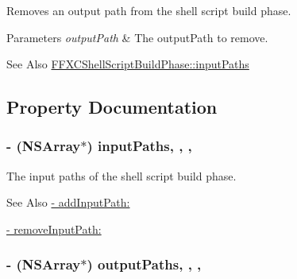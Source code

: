 Removes an output path from the shell script build phase. 
\begin{DoxyParams}{Parameters}
{\em output\-Path} & The output\-Path to remove. \\
\hline
\end{DoxyParams}
\begin{DoxySeeAlso}{See Also}
\hyperlink{interface_f_f_x_c_shell_script_build_phase_ad781d48348c3eac6e5e68aaded4d714f}{F\-F\-X\-C\-Shell\-Script\-Build\-Phase\-::input\-Paths} 
\end{DoxySeeAlso}


\subsection{Property Documentation}
\hypertarget{interface_f_f_x_c_shell_script_build_phase_ad781d48348c3eac6e5e68aaded4d714f}{
\subsubsection[{input\-Paths}]{\setlength{\rightskip}{0pt plus 5cm}-\/ (N\-S\-Array$\ast$) input\-Paths\hspace{0.3cm}{\ttfamily [read]}, {\ttfamily [write]}, {\ttfamily [nonatomic]}, {\ttfamily [strong]}}}\label{interface_f_f_x_c_shell_script_build_phase_ad781d48348c3eac6e5e68aaded4d714f}
The input paths of the shell script build phase. \begin{DoxySeeAlso}{See Also}
\hyperlink{interface_f_f_x_c_shell_script_build_phase_a0848de3624765e3930c55841ef062eab}{-\/ add\-Input\-Path\-:} 

\hyperlink{interface_f_f_x_c_shell_script_build_phase_ae426273f10e23456d8a38403bae781db}{-\/ remove\-Input\-Path\-:} 
\end{DoxySeeAlso}
\hypertarget{interface_f_f_x_c_shell_script_build_phase_a55d07f36a782c0d42d290bd91d271839}{
\subsubsection[{output\-Paths}]{\setlength{\rightskip}{0pt plus 5cm}-\/ (N\-S\-Array$\ast$) output\-Paths\hspace{0.3cm}{\ttfamily [read]}, {\ttfamily [write]}, {\ttfamily [nonatomic]}, {\ttfamily [strong]}}}\label{interface_f_f_x_c_shell_script_build_phase_a55d07f36a782c0d42d290bd91d271839}
